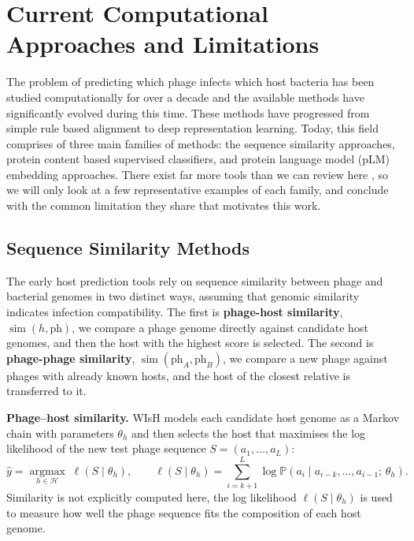 
\section{Current Computational Approaches and Limitations}
\label{sec2.2: current approaches}
The problem of predicting which phage infects which host bacteria has been studied computationally for over a 
decade and the available methods have significantly evolved during this time. These methods have progressed 
from simple rule based alignment to deep representation learning. Today, this field comprises of three main 
families of methods: the sequence similarity approaches, protein content based supervised classifiers, and protein 
language model (pLM) embedding approaches. There exist far more tools than we can review here \cite{coclet2021global}, 
so we will only look at a few representative examples of each family, and conclude with the common limitation they 
share that motivates this work.

 \subsection{Sequence Similarity Methods}
\label{sec2.2.1: classical methods}
The early host prediction tools rely on sequence similarity between phage and bacterial genomes in two distinct ways, 
assuming that genomic similarity indicates infection compatibility. The first is \textbf{phage-host similarity}, 
$\operatorname{sim}(h, \mathrm{ph})$, we compare a phage genome directly against candidate host genomes, and then the 
host with the highest score is selected. The second is \textbf{phage-phage similarity}, $\operatorname{sim}
(\mathrm{ph}_A, \mathrm{ph}_B)$, we compare a new phage against phages with already known hosts, and the host of the 
closest relative is transferred to it. 

\noindent\textbf{Phage--host similarity.} WIsH \cite{galiez2017wish} models each candidate host genome as 
a Markov chain with parameters $\theta_h$ and then selects the host that maximises the 
log likelihood of the new test phage sequence $S = (a_1, \ldots, a_L)$:
\begin{equation*}
\hat{y} = \operatorname*{argmax}_{h \in \mathcal{H}}\; \ell(S \mid \theta_h), \qquad \ell(S \mid \theta_h) = \sum_{i=k+1}
^{L} \log \mathbb{P}(a_i \mid a_{i-k}, \ldots, a_{i-1};\, \theta_h).
\end{equation*}
Similarity is not explicitly computed here, the log likelihood $\ell(S \mid \theta_h)$ is used to measure 
how well the phage sequence fits the composition of each host genome.

